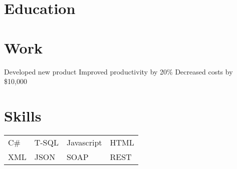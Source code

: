 \documentclass{my_resume}
\begin{document}
\section{Education}
\section{Work}
\workitems
{Developed new product}
{Improved productivity by 20\%}
{Decreased costs by \$10,000}
 
\section{Skills}
\begin{tabular}{l l l l}
C\# & T-SQL & Javascript & HTML \\
XML & JSON & SOAP & REST
\end{tabular}
 
\end{document}
